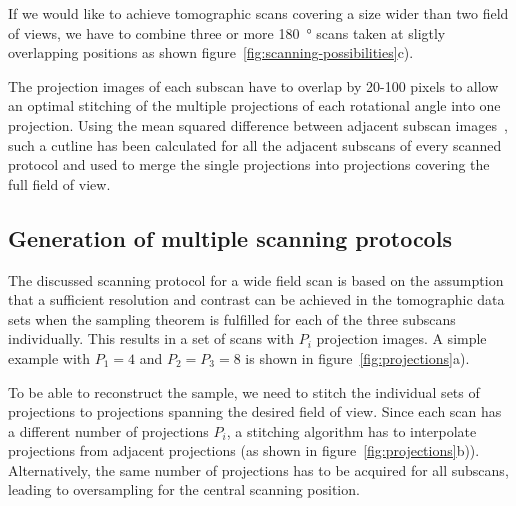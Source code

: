 If we would like to achieve tomographic scans covering a size wider than two field of views, we have to combine three or more \SI{180}{\degree} scans taken at sligtly overlapping positions as shown figure~\ref{fig:scanning-possibilities}c).

The projection images of each subscan have to overlap by 20-100 pixels to allow an optimal stitching of the multiple projections of each rotational angle into one projection. Using the mean squared difference between adjacent subscan images~\cite{Hintermueller2009}, such a cutline has been calculated for all the adjacent subscans of every scanned protocol and used to merge the single projections into projections covering the full field of view.

\subsection{Generation of multiple scanning protocols}%
The discussed scanning protocol for a wide field scan is based on the assumption that a sufficient resolution and contrast can be achieved in the tomographic data sets when the sampling theorem is fulfilled for each of the three subscans individually. This results in a set of scans with $P_{i}$ projection images. A simple example with $P_{1}=4$ and $P_{2}=P_{3}=8$ is shown in figure~\ref{fig:projections}a).

To be able to reconstruct the sample, we need to stitch the individual sets of projections to projections spanning the desired field of view. Since each scan has a different number of projections $P_{i}$, a stitching algorithm has to interpolate projections from adjacent projections (as shown in figure~\ref{fig:projections}b)). Alternatively, the same number of projections has to be acquired for all subscans, leading to oversampling for the central scanning position.

